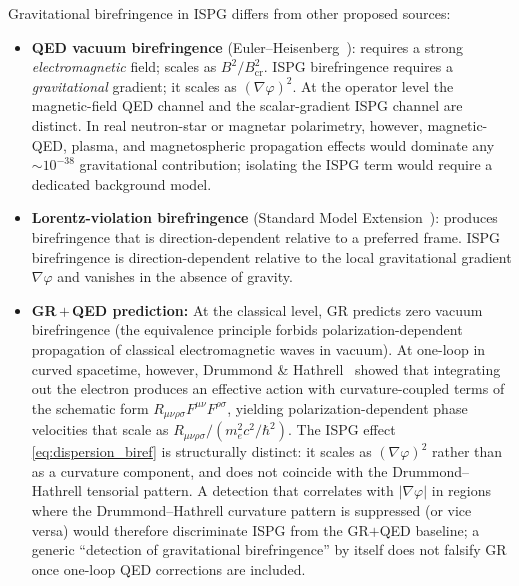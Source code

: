 \documentclass[aps,prd,onecolumn,superscriptaddress,nofootinbib,showpacs,12pt,notitlepage]{revtex4-2}
\begin{document}
Gravitational birefringence in ISPG differs from other
proposed sources:
\begin{itemize}
  \item \textbf{QED vacuum birefringence}
    (Euler--Heisenberg~\cite{EulerHeisenberg1936}):
    requires a strong \emph{electromagnetic} field;
    scales as $B^{2}/B_{\mathrm{cr}}^{2}$.
    ISPG birefringence requires a \emph{gravitational}
    gradient; it scales as $(\nabla\varphi)^{2}$.
    At the operator level the magnetic-field QED channel
    and the scalar-gradient ISPG channel are distinct.  In
    real neutron-star or magnetar polarimetry, however,
    magnetic-QED, plasma, and magnetospheric propagation
    effects would dominate any $\sim 10^{-38}$ gravitational
    contribution; isolating the ISPG term would require a
    dedicated background model.
  \item \textbf{Lorentz-violation birefringence}
    (Standard Model Extension~\cite{Colladay1998}):
    produces birefringence that is direction-dependent
    relative to a preferred frame.  ISPG birefringence
    is direction-dependent relative to the local
    gravitational gradient $\nabla\varphi$ and vanishes
    in the absence of gravity.
  \item \textbf{GR\,$+$\,QED prediction:} At the classical
    level, GR predicts zero vacuum birefringence (the
    equivalence principle forbids polarization-dependent
    propagation of classical electromagnetic waves in
    vacuum).  At one-loop in curved spacetime, however,
    Drummond \& Hathrell~\cite{DrummondHathrell1980} showed
    that integrating out the electron produces an effective
    action with curvature-coupled terms of the schematic
    form $R_{\mu\nu\rho\sigma}F^{\mu\nu}F^{\rho\sigma}$,
    yielding polarization-dependent phase velocities that
    scale as $R_{\mu\nu\rho\sigma}/(m_e^{2}c^{2}/\hbar^{2})$.
    The ISPG effect \eqref{eq:dispersion_biref} is
    structurally distinct: it scales as $(\nabla\varphi)^{2}$
    rather than as a curvature component, and does not
    coincide with the Drummond--Hathrell tensorial pattern.
    A detection that correlates with $|\nabla\varphi|$ in
    regions where the Drummond--Hathrell curvature pattern
    is suppressed (or vice versa) would therefore
    discriminate ISPG from the GR$+$QED baseline; a generic
    ``detection of gravitational birefringence'' by itself
    does not falsify GR once one-loop QED corrections are
    included.
\end{itemize}

\end{document}

